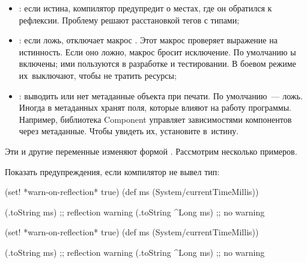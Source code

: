 \begin{itemize}


\item
  : если истина, компилятор предупредит о местах, где
  он обратился к рефлексии. Проблему решают расстановкой тегов с типами;


\item
  : если ложь, отключает макрос . Этот макрос
  проверяет выражение на истинность. Если оно ложно, макрос бросит исключение.
  По умолчанию ы включены; ими пользуются в разработке и
  тестировании. В боевом режиме их~выключают, чтобы не тратить ресурсы;

\label{print-meta}


\item
  : выводить или нет метаданные объекта при печати. По
  умолчанию~--- ложь. Иногда в метаданных хранят поля, которые влияют на работу
  программы. Например, библиотека Component управляет зависимостями компонентов
  через метаданные. Чтобы увидеть их, установите  в~истину.

\end{itemize}

Эти и другие переменные изменяют формой . Рассмотрим несколько
примеров.

Показать предупреждения, если компилятор не вывел тип:

\ifnarrow

\begin{clojure}
(set! *warn-on-reflection* true)
(def ms (System/currentTimeMillis))

(.toString ms) ;; reflection warning
(.toString ^Long ms) ;; no warning
\end{clojure}

\else

\begin{clojure}
(set! *warn-on-reflection* true)
(def ms (System/currentTimeMillis))

(.toString ms)       ;; reflection warning
(.toString ^Long ms) ;; no warning
\end{clojure}

